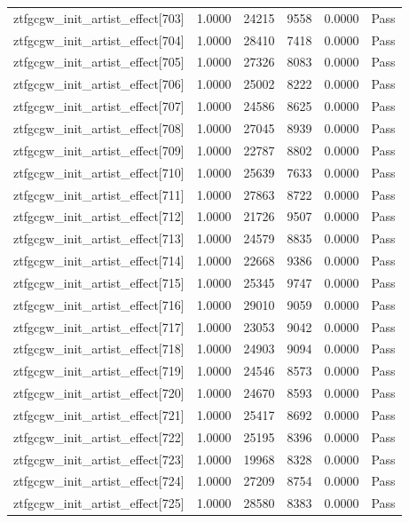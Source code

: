 \begin{table}[htbp]
\begin{tabular}{llrrll}
ztfgcgw\_init\_artist\_effect[703] & 1.0000 & 24215 & 9558 & 0.0000 & Pass \\
ztfgcgw\_init\_artist\_effect[704] & 1.0000 & 28410 & 7418 & 0.0000 & Pass \\
ztfgcgw\_init\_artist\_effect[705] & 1.0000 & 27326 & 8083 & 0.0000 & Pass \\
ztfgcgw\_init\_artist\_effect[706] & 1.0000 & 25002 & 8222 & 0.0000 & Pass \\
ztfgcgw\_init\_artist\_effect[707] & 1.0000 & 24586 & 8625 & 0.0000 & Pass \\
ztfgcgw\_init\_artist\_effect[708] & 1.0000 & 27045 & 8939 & 0.0000 & Pass \\
ztfgcgw\_init\_artist\_effect[709] & 1.0000 & 22787 & 8802 & 0.0000 & Pass \\
ztfgcgw\_init\_artist\_effect[710] & 1.0000 & 25639 & 7633 & 0.0000 & Pass \\
ztfgcgw\_init\_artist\_effect[711] & 1.0000 & 27863 & 8722 & 0.0000 & Pass \\
ztfgcgw\_init\_artist\_effect[712] & 1.0000 & 21726 & 9507 & 0.0000 & Pass \\
ztfgcgw\_init\_artist\_effect[713] & 1.0000 & 24579 & 8835 & 0.0000 & Pass \\
ztfgcgw\_init\_artist\_effect[714] & 1.0000 & 22668 & 9386 & 0.0000 & Pass \\
ztfgcgw\_init\_artist\_effect[715] & 1.0000 & 25345 & 9747 & 0.0000 & Pass \\
ztfgcgw\_init\_artist\_effect[716] & 1.0000 & 29010 & 9059 & 0.0000 & Pass \\
ztfgcgw\_init\_artist\_effect[717] & 1.0000 & 23053 & 9042 & 0.0000 & Pass \\
ztfgcgw\_init\_artist\_effect[718] & 1.0000 & 24903 & 9094 & 0.0000 & Pass \\
ztfgcgw\_init\_artist\_effect[719] & 1.0000 & 24546 & 8573 & 0.0000 & Pass \\
ztfgcgw\_init\_artist\_effect[720] & 1.0000 & 24670 & 8593 & 0.0000 & Pass \\
ztfgcgw\_init\_artist\_effect[721] & 1.0000 & 25417 & 8692 & 0.0000 & Pass \\
ztfgcgw\_init\_artist\_effect[722] & 1.0000 & 25195 & 8396 & 0.0000 & Pass \\
ztfgcgw\_init\_artist\_effect[723] & 1.0000 & 19968 & 8328 & 0.0000 & Pass \\
ztfgcgw\_init\_artist\_effect[724] & 1.0000 & 27209 & 8754 & 0.0000 & Pass \\
ztfgcgw\_init\_artist\_effect[725] & 1.0000 & 28580 & 8383 & 0.0000 & Pass \\

\end{tabular}
\end{table}
